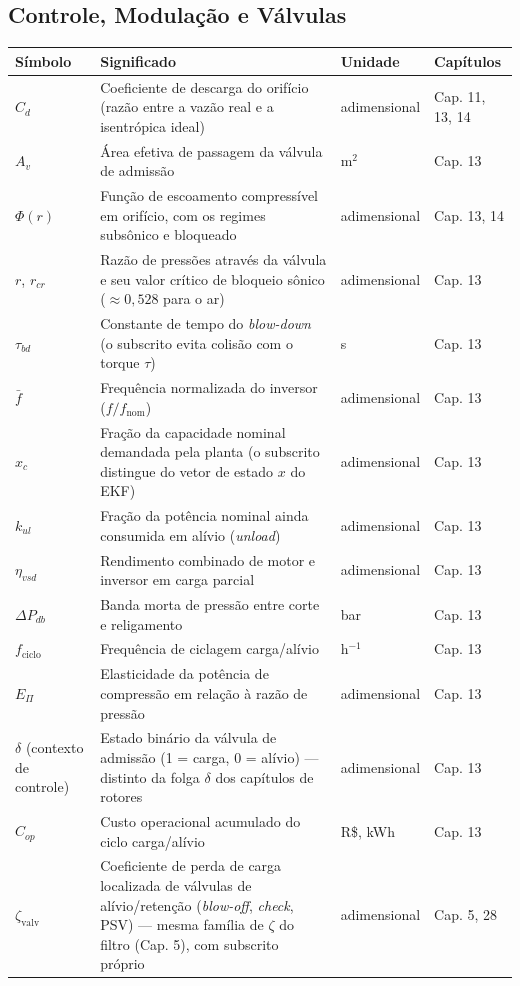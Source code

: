 \documentclass[12pt,a4paper]{article}
\numberwithin{equation}{section}
\numberwithin{table}{section}
\numberwithin{figure}{section}
\begin{document}
{\subsection*{Controle, Modulação e Válvulas}
\begin{longtable}{>{\raggedright\arraybackslash}p{2.8cm} >{\raggedright\arraybackslash}p{5.3cm} >{\raggedright\arraybackslash}p{2.1cm} >{\raggedright\arraybackslash}p{4.2cm}}
	\toprule
	\textbf{Símbolo} & \textbf{Significado} & \textbf{Unidade} & \textbf{Capítulos} \\ \midrule
	\endhead
	$C_d$ & Coeficiente de descarga do orifício (razão entre a vazão real e a isentrópica ideal) & adimensional & Cap. 11, 13, 14 \\
	$A_v$ & Área efetiva de passagem da válvula de admissão & m$^2$ & Cap. 13 \\
	$\Phi(r)$ & Função de escoamento compressível em orifício, com os regimes subsônico e bloqueado & adimensional & Cap. 13, 14 \\
	$r$, $r_{cr}$ & Razão de pressões através da válvula e seu valor crítico de bloqueio sônico ($\approx 0{,}528$ para o ar) & adimensional & Cap. 13 \\
	$\tau_{bd}$\dag & Constante de tempo do \textit{blow-down} (o subscrito evita colisão com o torque $\tau$) & s & Cap. 13 \\
	$\bar{f}$ & Frequência normalizada do inversor ($f/f_{\text{nom}}$) & adimensional & Cap. 13 \\
	$x_c$\dag & Fração da capacidade nominal demandada pela planta (o subscrito distingue do vetor de estado $x$ do EKF) & adimensional & Cap. 13 \\
	$k_{ul}$ & Fração da potência nominal ainda consumida em alívio (\textit{unload}) & adimensional & Cap. 13 \\
	$\eta_{vsd}$ & Rendimento combinado de motor e inversor em carga parcial & adimensional & Cap. 13 \\
	$\Delta P_{db}$ & Banda morta de pressão entre corte e religamento & bar & Cap. 13 \\
	$f_{\text{ciclo}}$ & Frequência de ciclagem carga/alívio & h$^{-1}$ & Cap. 13 \\
	$E_{\Pi}$ & Elasticidade da potência de compressão em relação à razão de pressão & adimensional & Cap. 13 \\
	$\delta$ (contexto de controle)\dag & Estado binário da válvula de admissão (1 = carga, 0 = alívio) — distinto da folga $\delta$ dos capítulos de rotores & adimensional & Cap. 13 \\
	$C_{op}$ & Custo operacional acumulado do ciclo carga/alívio & R\$, kWh & Cap. 13 \\
	$\zeta_{\text{valv}}$\dag & Coeficiente de perda de carga localizada de válvulas de alívio/retenção (\textit{blow-off}, \textit{check}, PSV) — mesma família de $\zeta$ do filtro (Cap. 5), com subscrito próprio & adimensional & Cap. 5, 28 \\ \bottomrule
\end{longtable}

}
\end{document}
